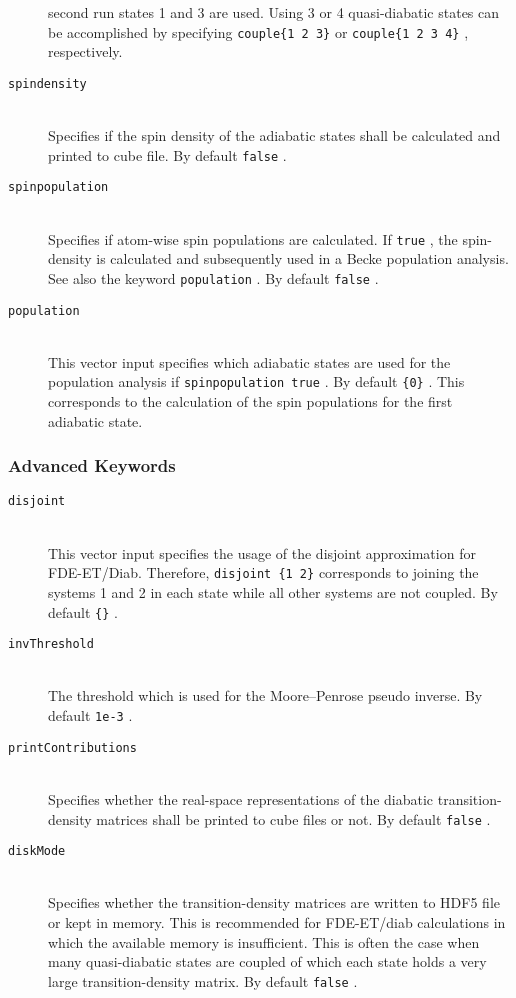 \documentclass[bibliography=totocnumbered,a4paper,10pt,oneside]{scrbook}
\newcommand{\ttt}[1]{%
  \begingroup\setlength{\fboxsep}{1pt}%
  \colorbox{serenity-green!30}{\texttt{\hspace*{2pt}\vphantom{(g}#1\hspace*{2pt}}}%
  \endgroup
}
\begin{document}
\begin{description}
  second run states 1 and 3 are used. Using 3 or 4 quasi-diabatic states can be accomplished by specifying
  \ttt{couple\{1 2 3\}} or \ttt{couple\{1 2 3 4\}}, respectively.
  \item [\texttt{spindensity}]\hfill \\
  Specifies if the spin density of the adiabatic states shall be calculated and printed to cube file. By default \ttt{false}.
  \item [\texttt{spinpopulation}]\hfill \\
  Specifies if atom-wise spin populations are calculated. If \ttt{true}, the spin-density is calculated and subsequently
  used in a Becke population analysis. See also the keyword \ttt{population}. By default \ttt{false}.
  \item [\texttt{population}]\hfill \\
  This vector input specifies which adiabatic states are used for the population analysis if \ttt{spinpopulation true}. By default \ttt{\{0\}}. This corresponds to the calculation of the spin populations for the first adiabatic state.
\end{description}
\subsubsection{Advanced Keywords}
\begin{description}
  \item [\texttt{disjoint}]\hfill \\
  This vector input specifies the usage of the disjoint approximation for FDE-ET/Diab. Therefore, \ttt{disjoint \{1 2\}} corresponds to joining
  the systems 1 and 2 in each state while all other systems are not coupled. By default \ttt{\{\}}.
  \item [\texttt{invThreshold}]\hfill \\
  The threshold which is used for the Moore--Penrose pseudo inverse. By default \ttt{1e-3}.
  \item [\texttt{printContributions}]\hfill \\
  Specifies whether the real-space representations of the diabatic transition-density matrices shall be printed to cube
  files or not. By default \ttt{false}.
  \item [\texttt{diskMode}]\hfill \\
  Specifies whether the transition-density matrices are written to HDF5 file or kept in memory. This is recommended for FDE-ET/diab calculations in which the available memory is insufficient.
  This is often the case when many quasi-diabatic states are coupled of which each state holds a very large transition-density matrix. By default \ttt{false}.

\end{description}
\end{document}
